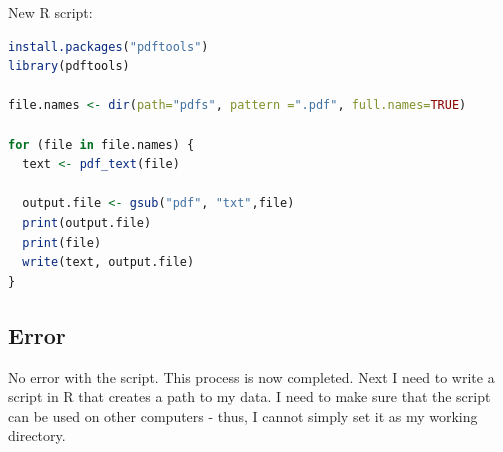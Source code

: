 \documentclass{article}
\begin{document}
New R script:
\begin{lstlisting}[language=R]
install.packages("pdftools")
library(pdftools)

file.names <- dir(path="pdfs", pattern =".pdf", full.names=TRUE)

for (file in file.names) {
  text <- pdf_text(file)

  output.file <- gsub("pdf", "txt",file)
  print(output.file)
  print(file)
  write(text, output.file)
}
\end{lstlisting}

\subsection{Error}
No error with the script. This process is now completed. Next I need to write a script in R that creates a path to my data. I need to make sure that the script can be used on other computers - thus, I cannot simply set it as my working directory. 
\end{document}

